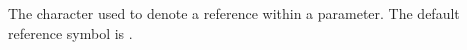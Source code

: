 
\item[Reference Symbol]{
The character used to denote a reference within a parameter.
The default reference symbol is \bxshell{=}.
}
